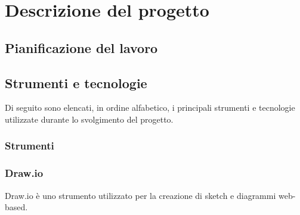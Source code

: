 \chapter{Descrizione del progetto}
\label{cap:descrizione-progetto}

\section{Pianificazione del lavoro}

\section{Strumenti e tecnologie}

\par Di seguito sono elencati, in ordine alfabetico, i principali strumenti e tecnologie utilizzate durante lo svolgimento del progetto.

\subsection{Strumenti}

\subsection*{Draw.io}

\par Draw.io è uno strumento utilizzato per la creazione di sketch e diagrammi web-based.